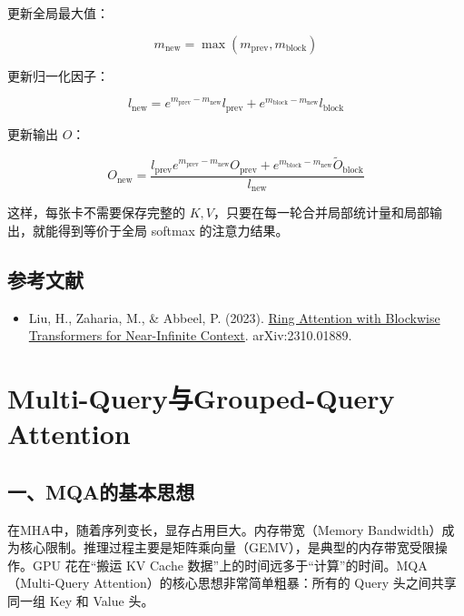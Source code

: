 更新全局最大值：

\[
m_{\mathrm{new}} = \max(m_{\mathrm{prev}}, m_{\mathrm{block}})
\]

更新归一化因子：

\[
l_{\mathrm{new}} =
e^{m_{\mathrm{prev}} - m_{\mathrm{new}}} l_{\mathrm{prev}}
+ e^{m_{\mathrm{block}} - m_{\mathrm{new}}} l_{\mathrm{block}}
\]

更新输出 \(O\)：

\[
O_{\mathrm{new}} =
\frac{
l_{\mathrm{prev}} e^{m_{\mathrm{prev}} - m_{\mathrm{new}}} O_{\mathrm{prev}}
+ e^{m_{\mathrm{block}} - m_{\mathrm{new}}} \tilde O_{\mathrm{block}}
}{
l_{\mathrm{new}}
}
\]

这样，每张卡不需要保存完整的 \(K, V\)，只要在每一轮合并局部统计量和局部输出，就能得到等价于全局 softmax 的注意力结果。

\hypertarget{ux53c2ux8003ux6587ux732e-92}{%
\subsection{参考文献}\label{ux53c2ux8003ux6587ux732e-92}}

\begin{itemize}
\tightlist
\item
  Liu, H., Zaharia, M., \& Abbeel, P. (2023). \href{https://arxiv.org/abs/2310.01889}{Ring Attention with Blockwise Transformers for Near-Infinite Context}. arXiv:2310.01889.
\end{itemize}

\clearpage

\hypertarget{multi-queryux4e0egrouped-query-attention}{%
\section{Multi-Query与Grouped-Query Attention}\label{multi-queryux4e0egrouped-query-attention}}

\hypertarget{ux4e00mqaux7684ux57faux672cux601dux60f3}{%
\subsection{一、MQA的基本思想}\label{ux4e00mqaux7684ux57faux672cux601dux60f3}}

在MHA中，随着序列变长，显存占用巨大。内存带宽（Memory Bandwidth）成为核心限制。推理过程主要是矩阵乘向量（GEMV），是典型的内存带宽受限操作。GPU 花在``搬运 KV Cache 数据''上的时间远多于``计算''的时间。MQA（Multi-Query Attention）的核心思想非常简单粗暴：所有的 Query 头之间共享同一组 Key 和 Value 头。

